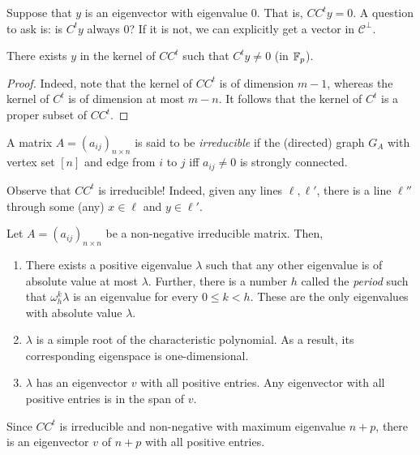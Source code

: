 \documentclass{article}
\begin{document}
	Suppose that $y$ is an eigenvector with eigenvalue $0$. That is, $CC^ty = 0$. A question to ask is: is $C^ty$ always $0$? If it is not, we can explicitly get a vector in $\mathcal{C}^\perp$.

	\begin{prop}
		There exists $y$ in the kernel of $CC^t$ such that $C^ty \ne 0$ (in $\mathbb{F}_p$).
	\end{prop}
	\begin{proof}
		Indeed, note that the kernel of $CC^t$ is of dimension $m-1$, whereas the kernel of $C^t$ is of dimension at most $m-n$. It follows that the kernel of $C^t$ is a proper subset of $CC^t$.
	\end{proof}

	\begin{definition}
		A matrix $A = (a_{ij})_{n \times n}$ is said to be \emph{irreducible} if the (directed) graph $G_A$ with vertex set $[n]$ and edge from $i$ to $j$ iff $a_{ij} \ne 0$ is strongly connected.
	\end{definition}

	Observe that $CC^t$ is irreducible! Indeed, given any lines $\ell,\ell'$, there is a line $\ell''$ through some (any) $x \in \ell$ and $y \in \ell'$.

	\begin{ftheo}
		Let $A = (a_{ij})_{n\times n}$ be a non-negative irreducible matrix. Then,
		\begin{enumerate}
			\item There exists a positive eigenvalue $\lambda$ such that any other eigenvalue is of absolute value at most $\lambda$. Further, there is a number $h$ called the \emph{period} such that $\omega_h^k \lambda$ is an eigenvalue for every $0 \le k < h$. These are the only eigenvalues with absolute value $\lambda$.
			\item $\lambda$ is a simple root of the characteristic polynomial. As a result, its corresponding eigenspace is one-dimensional.
			\item $\lambda$ has an eigenvector $v$ with all positive entries. Any eigenvector with all positive entries is in the span of $v$.
		\end{enumerate}
	\end{ftheo}

	Since $CC^t$ is irreducible and non-negative with maximum eigenvalue $n+p$, there is an eigenvector $v$ of $n+p$ with all positive entries.
\end{document}
